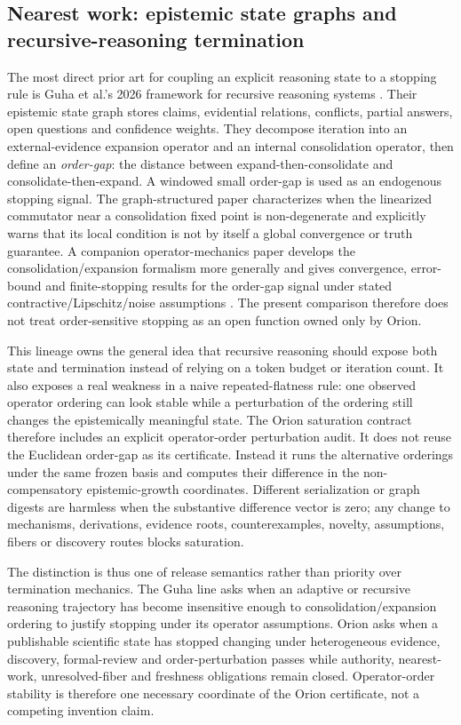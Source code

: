 \subsection{Nearest work: epistemic state graphs and recursive-reasoning termination}

The most direct prior art for coupling an explicit reasoning state to a stopping rule is Guha et al.'s 2026 framework for recursive reasoning systems \cite{guha2026termination}. Their epistemic state graph stores claims, evidential relations, conflicts, partial answers, open questions and confidence weights. They decompose iteration into an external-evidence expansion operator and an internal consolidation operator, then define an \emph{order-gap}: the distance between expand-then-consolidate and consolidate-then-expand. A windowed small order-gap is used as an endogenous stopping signal. The graph-structured paper characterizes when the linearized commutator near a consolidation fixed point is non-degenerate and explicitly warns that its local condition is not by itself a global convergence or truth guarantee. A companion operator-mechanics paper develops the consolidation/expansion formalism more generally and gives convergence, error-bound and finite-stopping results for the order-gap signal under stated contractive/Lipschitz/noise assumptions \cite{guha2026opmech}. The present comparison therefore does not treat order-sensitive stopping as an open function owned only by Orion.

This lineage owns the general idea that recursive reasoning should expose both state and termination instead of relying on a token budget or iteration count. It also exposes a real weakness in a naive repeated-flatness rule: one observed operator ordering can look stable while a perturbation of the ordering still changes the epistemically meaningful state. The Orion saturation contract therefore includes an explicit operator-order perturbation audit. It does not reuse the Euclidean order-gap as its certificate. Instead it runs the alternative orderings under the same frozen basis and computes their difference in the non-compensatory epistemic-growth coordinates. Different serialization or graph digests are harmless when the substantive difference vector is zero; any change to mechanisms, derivations, evidence roots, counterexamples, novelty, assumptions, fibers or discovery routes blocks saturation.

The distinction is thus one of release semantics rather than priority over termination mechanics. The Guha line asks when an adaptive or recursive reasoning trajectory has become insensitive enough to consolidation/expansion ordering to justify stopping under its operator assumptions. Orion asks when a publishable scientific state has stopped changing under heterogeneous evidence, discovery, formal-review and order-perturbation passes while authority, nearest-work, unresolved-fiber and freshness obligations remain closed. Operator-order stability is therefore one necessary coordinate of the Orion certificate, not a competing invention claim.

